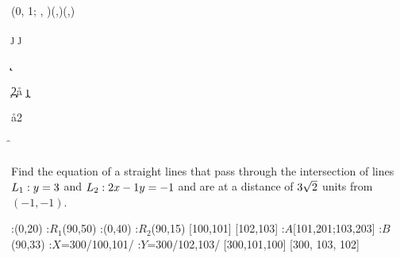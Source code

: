 



\MULTIPLY{}\a
\SOLVELINEARSYSTEM(0, 1; \vbtwo, \vbthree)(\vbone,\vbfour)(\p,\q)

\ADD{}\j
\SQUARE\j\jj

\ADD{}\k
\SQUARE\k\kk

\SQUARE\vbfive\c
\MULTIPLY\c{2}\d

\SUBTRACT\d\jj\aa
\MULTIPLY\j\k\x
\MULTIPLY{}\bb
\SUBTRACT\d\kk\cc

\gcalcexpr[0]
\MULTIPLY{}\mbb
\MULTIPLY\aa{2}\dnm

\ADD\mbb\disc\f
\SUBTRACT\mbb\disc\g


\question[4] Find the equation of a straight lines that pass
 through the intersection of lines $L_1: y=3$ and 
 $L_2: 2 x -1 y = -1$ and are at a distance of $3\sqrt{2}$
 units from $(-1, -1)$.


\watchout

\ifprintanswers
  \begin{marginfigure}[+40 pt]
      :(0,20)
      :$R_1$(90,50)
      :(0,40)
      :$R_2$(90,15)
      [100,101]
      [102,103]
      :$A$[101,201;103,203] %
      :$B$ (90,33)
      :$X$=300/100,101/
      :$Y$=300/102,103/
    \figdrawbegin{}
      \figdrawline [100,101]
      \figdrawline [102,103]
       [300,101,100]
       [300, 103, 102]
    \figdrawend
    \centerline{\box\figBoxA}
  \end{marginfigure}
\fi 


